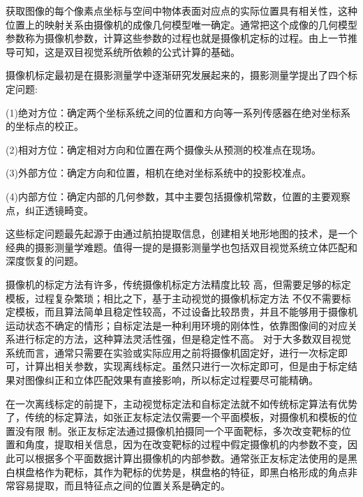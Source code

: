 获取图像的每个像素点坐标与空间中物体表面对应点的实际位置具有相关性，这种位置上的映射关系由摄像机的成像几何模型唯一确定。通常把这个成像的几何模型参数称为摄像机参数，计算这些参数的过程也就是摄像机定标的过程。由上一节推导可知，这是双目视觉系统所依赖的公式计算的基础。

摄像机标定最初是在摄影测量学中逐渐研究发展起来的，摄影测量学提出了四个标定问题:

(1)绝对方位：确定两个坐标系统之间的位置和方向等一系列传感器在绝对坐标系的坐标点的校正。

(2)相对方位：确定相对方向和位置在两个摄像头从预测的校准点在现场。

(3)外部方位：确定方向和位置，相机在绝对坐标系统中的投影校准点。

(4)内部方位：确定内部的几何参数，其中主要包括摄像机常数，位置的主要观察点，纠正透镜畸变。

这些标定问题最先起源于由通过航拍提取信息，创建相关地形地图的技术，是一个经典的摄影测量学难题。值得一提的是摄影测量学也包括双目视觉系统立体匹配和深度恢复的问题。

摄像机的标定方法有许多，传统摄像机标定方法精度比较
高，但需要足够的标定模板，过程复杂繁琐；相比之下，基于主动视觉的摄像机标定方法
不仅不需要标定模板，而且算法简单且稳定性较高，不过设备比较昂贵，并且不能够用于摄像机运动状态不确定的情形；自标定法是一种利用环境的刚体性，依靠图像间的对应关系进行标定的方法，这种算法灵活性强，但是稳定性不高。 
对于大多数双目视觉系统而言，通常只需要在实验或实际应用之前将摄像机固定好，进行一次标定即可，计算出相关参数，实现离线标定。虽然只进行一次标定即可，但是由于标定结果对图像纠正和立体匹配效果有直接影响，所以标定过程要尽可能精确。

在一次离线标定的前提下，主动视觉标定法和自标定法就不如传统标定算法有优势了，传统的标定算法，如张正友标定法仅需要一个平面模板，对摄像机和模板的位置没有限
制。张正友标定法通过摄像机拍摄同一个平面靶标，多次改变靶标的位置和角度，提取相关信息，因为在改变靶标的过程中假定摄像机的内参数不变，因此可以根据多个平面数据计算出摄像机的内部参数。通常张正友标定法使用的是黑白棋盘格作为靶标，其作为靶标的优势是，棋盘格的特征，即黑白格形成的角点非常容易提取，而且特征点之间的位置关系是确定的。



